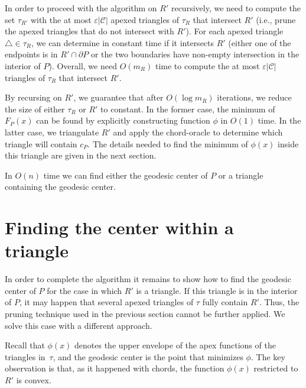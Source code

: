 \documentclass[a4paper,UKenglish]{lipics}
\newcommand{\F}[2]{\ensuremath{F_{\scriptscriptstyle #1}(#2)}}
\newcommand{\cp}{\ensuremath{c_P}}
\newcommand{\m}{\ensuremath{m_{\scriptscriptstyle R}}}
\newcommand{\reg}{\ensuremath{R'}}
\newcommand{\tcell}{4-cell\xspace}
\newcommand{\tcells}{4-cells\xspace}
\begin{document}
In order to proceed with the algorithm on  $\reg$ recursively, we need to compute the set $\tau_{\reg}$ with the at most $\varepsilon |\mathcal C|$ apexed triangles of $\tau_R$ that intersect $\reg$ (i.e., prune the apexed triangles that do not intersect with $\reg$). For each apexed triangle $\triangle\in \tau_R$, we can determine in constant time if it intersects $\reg$ (either one of the endpoints is in $\reg\cap \partial P$ or the two boundaries have non-empty intersection in the interior of $P$). 
Overall, we need $O(\m)$ time to compute the at most $\varepsilon |\mathcal C|$ triangles of $\tau_R$ that intersect $\reg$.

By recursing on $\reg$, we guarantee that after $O(\log \m)$ iterations, we reduce the size of either $\tau_R$ or $\reg$ to constant. 
In the former case, the minimum of $\F{P}{x}$ can be found by explicitly constructing function $\phi$ in $O(1)$ time. 
In the latter case, we triangulate $\reg$ and apply the chord-oracle to determine which triangle will contain $\cp$. 
The details needed to find the minimum of $\phi(x)$ inside this triangle are given in the next section.


\begin{lemma}\label{lemma:Finding the convex trapezoid}
In $O(n)$ time we can find either the geodesic center of $P$ or a triangle containing the geodesic center.
\end{lemma}

\section{Finding the center within a triangle}\label{Section:Solving convex optimization poblem}
In order to complete the algorithm it remains to show how to find the geodesic center of $P$ for the case in which $\reg$ is a triangle. If this triangle is in the interior of $P$, it may happen that several apexed triangles of $\tau$ fully contain $\reg$. 
Thus, the pruning technique used in the previous section cannot be further applied. We solve this case with a different approach.
  
Recall that $\phi(x)$ denotes the upper envelope of the apex functions of the triangles in~$\tau$, and the geodesic center is the point that minimizes $\phi$.
The key observation is that, as it happened with chords, the function $\phi(x)$ restricted to $\reg$ is convex. 
\end{document}
